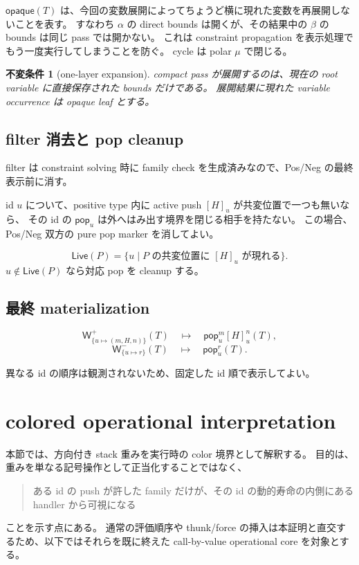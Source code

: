 \documentclass[uplatex,dvipdfmx,a4paper,10.5pt]{jsarticle}
\theoremstyle{jpplain}
\newtheorem{invariant}[definition]{不変条件}
\newcommand{\PWeight}[2]{\mathsf{W}^{+}_{#1}(#2)}
\newcommand{\NWeight}[2]{\mathsf{W}^{-}_{#1}(#2)}
\newcommand{\takeop}[2]{[#1]_{#2}}
\newcommand{\popop}[1]{\mathsf{pop}_{#1}}
\newcommand{\live}{\mathsf{Live}}
\newcommand{\opq}{\mathsf{opaque}}
\begin{document}
$\opq(T)$ は、今回の変数展開によってちょうど横に現れた変数を再展開しないことを表す。
すなわち $\alpha$ の direct bounds は開くが、その結果中の $\beta$ の bounds は同じ pass では開かない。
これは constraint propagation を表示処理でもう一度実行してしまうことを防ぐ。
cycle は polar $\mu$ で閉じる。

\begin{invariant}[one-layer expansion]
compact pass が展開するのは、現在の root variable に直接保存された bounds だけである。
展開結果に現れた variable occurrence は opaque leaf とする。
\end{invariant}

\subsection{filter 消去と pop cleanup}

filter は constraint solving 時に family check を生成済みなので、Pos/Neg の最終表示前に消す。

id $u$ について、positive type 内に active push $\takeop{H}{u}$ が共変位置で一つも無いなら、
その id の $\popop{u}$ は外へはみ出す境界を閉じる相手を持たない。
この場合、Pos/Neg 双方の pure pop marker を消してよい。

\[
  \live(P)=\{u\mid P\text{ の共変位置に }\takeop{H}{u}\text{ が現れる}\}.
\]
$u\notin\live(P)$ なら対応 pop を cleanup する。

\subsection{最終 materialization}

\[
\PWeight{\{u\mapsto(m,H,n)\}}{T}
\quad\mapsto\quad
\popop{u}^{m}\takeop{H}{u}^{n}(T),
\]
\[
\NWeight{\{u\mapsto r\}}{T}
\quad\mapsto\quad
\popop{u}^{r}(T).
\]

異なる id の順序は観測されないため、固定した id 順で表示してよい。

\section{colored operational interpretation}\label{sec:colored}

本節では、方向付き stack 重みを実行時の color 境界として解釈する。
目的は、重みを単なる記号操作として正当化することではなく、
\begin{quote}
ある id の push が許した family だけが、その id の動的寿命の内側にある handler から可視になる
\end{quote}
ことを示す点にある。
通常の評価順序や thunk/force の挿入は本証明と直交するため、以下ではそれらを既に終えた
call-by-value operational core を対象とする。
\end{document}
